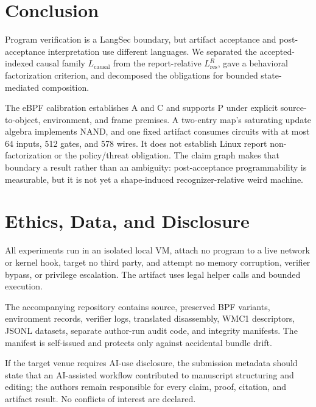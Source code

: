 \documentclass[conference]{IEEEtran}
\begin{document}
\section{Conclusion}

Program verification is a LangSec boundary, but artifact acceptance and post-acceptance interpretation use different languages. We separated the accepted-indexed causal family $L_{\mathrm{causal}}$ from the report-relative $L_{\mathrm{res}}^R$, gave a behavioral factorization criterion, and decomposed the obligations for bounded state-mediated composition.

The eBPF calibration establishes A and C and supports P under explicit source-to-object, environment, and frame premises. A two-entry map's saturating update algebra implements NAND, and one fixed artifact consumes circuits with at most 64 inputs, 512 gates, and 578 wires. It does not establish Linux report non-factorization or the policy/threat obligation. The claim graph makes that boundary a result rather than an ambiguity: post-acceptance programmability is measurable, but it is not yet a shape-induced recognizer-relative weird machine.

\section*{Ethics, Data, and Disclosure}

All experiments run in an isolated local VM, attach no program to a live network or kernel hook, target no third party, and attempt no memory corruption, verifier bypass, or privilege escalation. The artifact uses legal helper calls and bounded execution.

The accompanying repository contains source, preserved BPF variants, environment records, verifier logs, translated disassembly, WMC1 descriptors, JSONL datasets, separate author-run audit code, and integrity manifests. The manifest is self-issued and protects only against accidental bundle drift.

If the target venue requires AI-use disclosure, the submission metadata should state that an AI-assisted workflow contributed to manuscript structuring and editing; the authors remain responsible for every claim, proof, citation, and artifact result. No conflicts of interest are declared.
\end{document}
